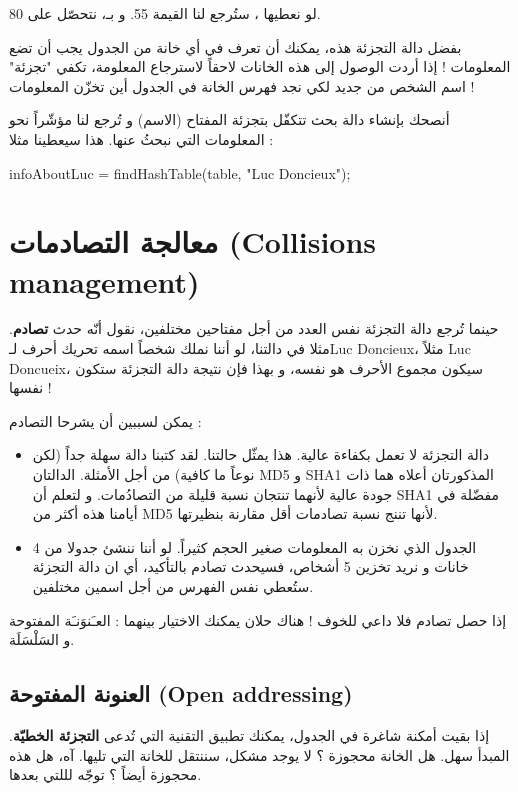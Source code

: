 لو نعطيها
،
ستُرجع لنا القيمة 55. و بـ،
نتحصّل على 80.

بفضل دالة التجزئة هذه، يمكنك أن تعرف في أي خانة من الجدول يجب أن تضع المعلومات ! إذا أردت الوصول إلى هذه الخانات لاحقاً لاسترجاع المعلومة، تكفي "تجزئة" اسم الشخص من جديد لكي نجد فهرس الخانة في الجدول أين تخزّن المعلومات !

أنصحك بإنشاء دالة بحث تتكفّل بتجزئة المفتاح (الاسم) و تُرجع لنا مؤشّراً نحو المعلومات التي نبحثُ عنها. هذا سيعطينا مثلا :

\begin{Csource}
infoAboutLuc = findHashTable(table, "Luc Doncieux");
\end{Csource}

\section{معالجة التصادمات (\textenglish{Collisions management})}

حينما تُرجع دالة التجزئة نفس العدد من أجل مفتاحين مختلفين، نقول أنّه حدث 
\textbf{تصادم}.
مثلا في دالتنا، لو أننا نملك شخصاً اسمه تحريك أحرف لـ\textenglish{Luc Doncieux}،
مثلاً
\textenglish{Luc Doncueix}،
سيكون مجموع الأحرف هو نفسه، و بهذا فإن نتيجة دالة التجزئة ستكون نفسها !

يمكن لسببين أن يشرحا التصادم :

\begin{itemize}
	\item دالة التجزئة لا تعمل بكفاءة عالية. هذا يمثّل حالتنا. لقد كتبنا دالة سهلة جداً (لكن نوعاً ما كافية) من أجل الأمثلة. الدالتان 
	\textenglish{MD5}
	و
	\textenglish{SHA1}
	المذكورتان أعلاه هما ذات جودة عالية لأنهما تنتجان نسبة قليلة من التصادُمات. و لتعلم أن 
	\textenglish{SHA1}
	مفضّلة في أيامنا هذه أكثر من
	\textenglish{MD5}
	لأنها تننج نسبة تصادمات أقل مقارنة بنظيرتها.
	
	\item الجدول الذي نخزن به المعلومات صغير الحجم كثيراً. لو أننا ننشئ جدولا من 4 خانات و نريد تخزين 5 أشخاص، فسيحدث تصادم بالتأكيد، أي ان دالة التجزئة ستُعطي نفس الفهرس من أجل اسمين مختلفين.
\end{itemize}

إذا حصل تصادم فلا داعي للخوف ! هناك حلان يمكنك الاختيار بينهما : العـَنوَنـَة المفتوحة و السَلْسَلَة.


\subsection{العنونة المفتوحة (\textenglish{Open addressing})}
إذا بقيت أمكنة شاغرة في الجدول، يمكنك تطبيق التقنية التي تُدعى 
\textbf{التجزئة الخطيّة}.
المبدأ سهل. هل الخانة محجوزة ؟ لا يوجد مشكل، سننتقل للخانة التي تليها. آه، هل هذه محجوزة أيضاً ؟ توجّه لللتي بعدها.

